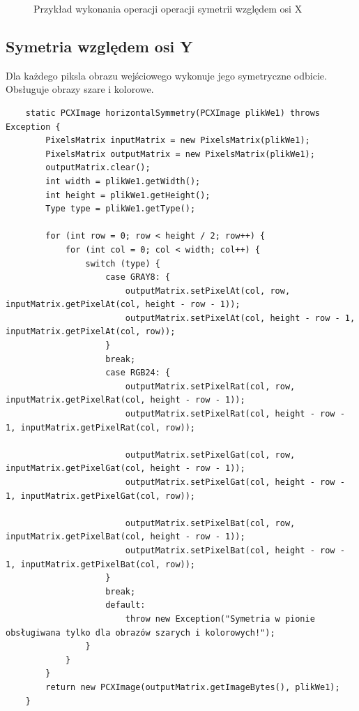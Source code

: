 \documentclass{article}
\begin{document}
\begin{figure}[!ht]
	\caption{Przykład wykonania operacji operacji symetrii względem osi X}
	\label{fig11}	
	\end{figure}
	
	
	\subsection{Symetria względem osi Y}
	Dla każdego piksla obrazu wejściowego wykonuje jego symetryczne odbicie.
	Obsługuje obrazy szare i kolorowe.
	
	\begin{verbatim}
	static PCXImage horizontalSymmetry(PCXImage plikWe1) throws Exception {
        PixelsMatrix inputMatrix = new PixelsMatrix(plikWe1);
        PixelsMatrix outputMatrix = new PixelsMatrix(plikWe1);
        outputMatrix.clear();
        int width = plikWe1.getWidth();
        int height = plikWe1.getHeight();
        Type type = plikWe1.getType();

        for (int row = 0; row < height / 2; row++) {
            for (int col = 0; col < width; col++) {
                switch (type) {
                    case GRAY8: {
                        outputMatrix.setPixelAt(col, row, inputMatrix.getPixelAt(col, height - row - 1));
                        outputMatrix.setPixelAt(col, height - row - 1, inputMatrix.getPixelAt(col, row));
                    }
                    break;
                    case RGB24: {
                        outputMatrix.setPixelRat(col, row, inputMatrix.getPixelRat(col, height - row - 1));
                        outputMatrix.setPixelRat(col, height - row - 1, inputMatrix.getPixelRat(col, row));

                        outputMatrix.setPixelGat(col, row, inputMatrix.getPixelGat(col, height - row - 1));
                        outputMatrix.setPixelGat(col, height - row - 1, inputMatrix.getPixelGat(col, row));

                        outputMatrix.setPixelBat(col, row, inputMatrix.getPixelBat(col, height - row - 1));
                        outputMatrix.setPixelBat(col, height - row - 1, inputMatrix.getPixelBat(col, row));
                    }
                    break;
                    default:
                        throw new Exception("Symetria w pionie obsługiwana tylko dla obrazów szarych i kolorowych!");
                }
            }
        }
        return new PCXImage(outputMatrix.getImageBytes(), plikWe1);
    }
	\end{verbatim}
\end{document}
